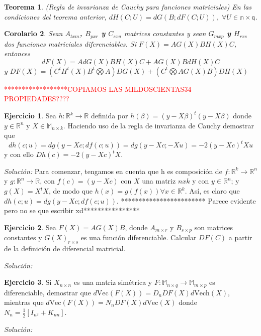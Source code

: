 \documentclass{article}
\theoremstyle{theorem-style}  %
\newtheorem{theorem}{Teorema}[section]  %
\newtheorem{corollary}[theorem]{Corolario} %
\theoremstyle{definition}
\theoremstyle{example-style}
\newtheorem{exercise}{Ejercicio}[section]
\begin{document}
\begin{theorem}(Regla de invarianza de Cauchy para funciones matriciales)
	En las condiciones del teorema anterior, $dH(C;U)=dG(B;dF(C;U)), \; \forall U\in \mathbb{n\times q}$.	
\end{theorem}

\begin{corollary}
	Sean \textbf{$A_{txm}$, $B_{pxr}$ y $C_{sxu}$} matrices constantes y sean \textbf{$G_{mxp}$ y $H_{rxs}$} dos funciones matriciales diferenciables. Si \textbf{$F(X) = AG(X)BH(X)C$}, entonces
	\textbf{$$ dF(X)= AdG(X)BH(X)C + AG(X)BdH(X)C $$}
	y \textbf{$DF(X)= (C^tH^t(X)B^t \bigotimes A)DG(X) + (C^t \bigotimes AG(X)B)DH(X)$} 
\end{corollary}

\textcolor{red}{******************COPIAMOS LAS MILDOSCIENTAS34 PROPIEDADES????}

\begin{exercise}
	Sea $h: \mathbb{R}^k \rightarrow \mathbb{R}$ definida por $h(\beta) = (y-X\beta)^t(y-X\beta)$ donde $y \in \mathbb{R}^n$ y $X\in\mathbb{M}_{n\times k}.$ Haciendo uso de la regla de invarianza de Cauchy demostrar que
	$$dh(c;u) = dg(y-Xc;df(c;u)) = dg(y-Xc;-Xu)=-2(y-Xc)^tXu$$
	y con ello $Dh(c)=-2(y-Xc)^tX$.
\end{exercise}
\textit{Solución:}
	Para comenzar, tengamos en cuenta que h es composición de $f: \mathbb{R}^k \rightarrow \mathbb{R}^n$ y $g:\mathbb{R}^n \rightarrow \mathbb{R}$, con $f(c) = (y-Xc)$ con $X$ una matriz $nxk$ y con $y \in \mathbb{R}^n$; y $g(X) = X^tX$, de modo que $h(x)=g(f(x)) \forall x \in  \mathbb{R}^k$. Así, es claro que  $dh(c;u) = dg(y-Xc;df(c;u))$. ************************ Parece evidente pero no se que escribir xd****************
\begin{exercise}
	Sea $F(X)=AG(X)B$, donde $A_{m\times r}$ y $B_{s\times p}$ son matrices constantes y $G(X)_{r\times s}$ es una función diferenciable. Calcular $DF(C)$ a partir de la definición de diferencial matricial.
\end{exercise}
\textit{Solución:}

\begin{exercise}
	Si $X_{n\times n}$ es una matriz simétrica y $F: \mathbb{M}_{n\times q} \rightarrow \mathbb{M}_{m\times p}$ es diferenciable, demostrar que $d\text{Vec}(F(X)) = D_nDF(X)d\text{Vech}(X)$, mientras que $d\text{Vec}(F(X)) = N_nDF(X)d\text{Vec}(X)$ donde $N_n = \frac{1}{2}[I_{n^2}+K_{nn}]$.
\end{exercise}
\textit{Solución:}
\end{document}
